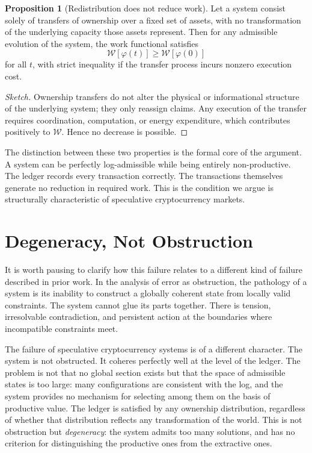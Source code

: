 \documentclass[12pt, oneside]{article}
\theoremstyle{definition}
\newtheorem{proposition}{Proposition}[section]
\newcommand{\field}{\varphi}
\newcommand{\Wfunc}{\mathcal{W}}
\begin{document}
\begin{proposition}[Redistribution does not reduce work]
Let a system consist solely of transfers of ownership over a fixed set of assets, with no transformation of the underlying capacity those assets represent. Then for any admissible evolution of the system, the work functional satisfies
\[
  \Wfunc[\field(t)] \geq \Wfunc[\field(0)]
\]
for all $t$, with strict inequality if the transfer process incurs nonzero execution cost.
\end{proposition}

\begin{proof}[Sketch]
Ownership transfers do not alter the physical or informational structure of the underlying system; they only reassign claims. Any execution of the transfer requires coordination, computation, or energy expenditure, which contributes positively to $\Wfunc$. Hence no decrease is possible.
\end{proof}

The distinction between these two properties is the formal core of the argument. A system can be perfectly log-admissible while being entirely non-productive. The ledger records every transaction correctly. The transactions themselves generate no reduction in required work. This is the condition we argue is structurally characteristic of speculative cryptocurrency markets.

\section{Degeneracy, Not Obstruction}

It is worth pausing to clarify how this failure relates to a different kind of failure described in prior work. In the analysis of error as obstruction, the pathology of a system is its inability to construct a globally coherent state from locally valid constraints. The system cannot glue its parts together. There is tension, irresolvable contradiction, and persistent action at the boundaries where incompatible constraints meet.

The failure of speculative cryptocurrency systems is of a different character. The system is not obstructed. It coheres perfectly well at the level of the ledger. The problem is not that no global section exists but that the space of admissible states is too large: many configurations are consistent with the log, and the system provides no mechanism for selecting among them on the basis of productive value. The ledger is satisfied by any ownership distribution, regardless of whether that distribution reflects any transformation of the world. This is not obstruction but \emph{degeneracy}: the system admits too many solutions, and has no criterion for distinguishing the productive ones from the extractive ones.
\end{document}

